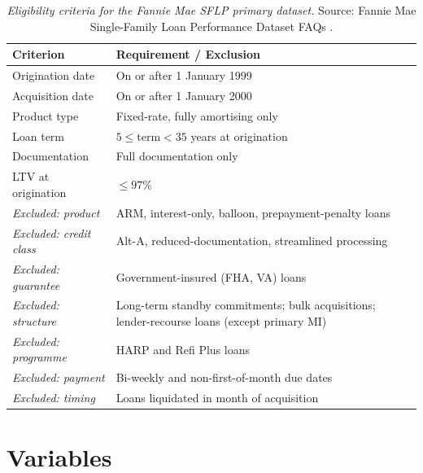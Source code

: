 \begin{table}[htbp]
  \centering
  \small
  \begin{tabularx}{\textwidth}{@{} l X @{}}
    \toprule
    \textbf{Criterion} & \textbf{Requirement / Exclusion} \\
    \midrule
    Origination date      & On or after 1 January 1999 \\[2pt]
    Acquisition date      & On or after 1 January 2000 \\[2pt]
    Product type          & Fixed-rate, fully amortising only \\[2pt]
    Loan term             & $5 \leq \mathrm{term} < 35$ years at origination \\[2pt]
    Documentation         & Full documentation only \\[2pt]
    LTV at origination    & $\leq 97\%$ \\[4pt]
    \emph{Excluded: product}      & ARM, interest-only, balloon,
                                    prepayment-penalty loans \\[2pt]
    \emph{Excluded: credit class} & Alt-A, reduced-documentation,
                                    streamlined processing \\[2pt]
    \emph{Excluded: guarantee}    & Government-insured (FHA, VA) loans \\[2pt]
    \emph{Excluded: structure}    & Long-term standby commitments;
                                    bulk acquisitions; lender-recourse
                                    loans (except primary MI) \\[2pt]
    \emph{Excluded: programme}    & HARP and Refi Plus loans \\[2pt]
    \emph{Excluded: payment}      & Bi-weekly and non-first-of-month
                                    due dates \\[2pt]
    \emph{Excluded: timing}       & Loans liquidated in month of
                                    acquisition \\
    \bottomrule
  \end{tabularx}
  \caption[Eligibility criteria for the Fannie Mae SFLP primary dataset]%
  {\textit{Eligibility criteria for the Fannie Mae SFLP primary
  dataset.}  Source: Fannie Mae Single-Family Loan Performance
  Dataset FAQs \citep{fanniemae2024}.}
  \label{tab:eligibility}
\end{table}

\section{Variables}
\label{sec:data-variables}

